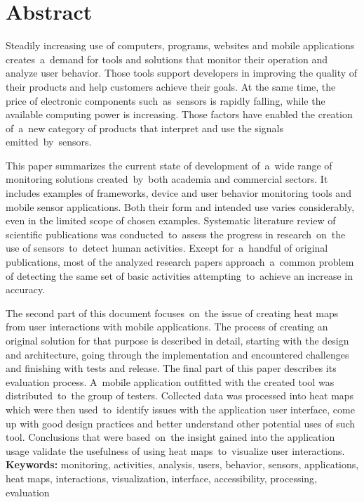 \chapter*{Abstract}
Steadily increasing use of computers, programs, websites and mobile applications creates~a~demand for tools and solutions that monitor their operation and analyze user behavior. Those tools support developers in improving the quality of their products and help customers achieve their goals. At the same time, the price of electronic components such~as~sensors is rapidly falling, while the available computing power is increasing. Those factors have enabled the creation of~a~new category of products that interpret and use the signals emitted~by~sensors.

This paper summarizes the current state of development of~a~wide range of monitoring solutions created~by~both academia and commercial sectors. It includes examples of frameworks, device and user behavior monitoring tools and mobile sensor applications. Both their form and intended use varies considerably, even in the limited scope of chosen examples. Systematic literature review of scientific publications was conducted~to~assess the progress in research~on~the use of sensors~to~detect human activities. Except for~a~handful of original publications, most of the analyzed research papers approach~a~common problem of detecting the same set of basic activities attempting~to~achieve an increase in accuracy.

The second part of this document focuses~on~the issue of creating heat maps from user interactions with mobile applications. The process of creating an original solution for that purpose is described in detail, starting with the design and architecture, going through the implementation and encountered challenges and finishing with tests and release. The final part of this paper describes its evaluation process. A~mobile application outfitted with the created tool was distributed~to~the group of testers. Collected data was processed into heat maps which were then used~to~identify issues with the application user interface, come up with good design practices and better understand other potential uses of such tool. Conclusions that were based~on~the insight gained into the application usage validate the usefulness of using heat maps~to~visualize user interactions. \\

\noindent\textbf{Keywords:} monitoring, activities, analysis, users, behavior, sensors, applications, heat maps, interactions, visualization, interface, accessibility, processing, evaluation
